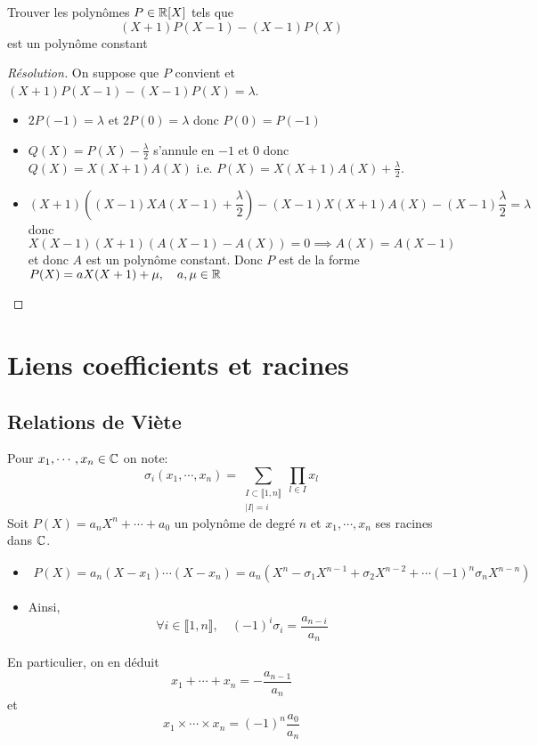 \begin{exo}
    Trouver les polynômes $P\in\mathbb R[X]$ tels que \[
        (X+1)P(X-1)-(X-1)P(X)
    \]
    est un polynôme constant
\end{exo}

\begin{proof}[Résolution]
    On suppose que $P$ convient et $(X+1)P(X-1)-(X-1)P(X)=\lambda$. \begin{itemize}
        \item $2P(-1)=\lambda$ et $2P(0)=\lambda$ donc $P(0)=P(-1)$
        \item $Q(X)=P(X)-\frac\lambda 2$ s'annule en $-1$ et $0$ donc $Q(X)=X(X+1)A(X)$ i.e.  $P(X)=X(X+1)A(X)+\frac\lambda 2$.
        \item \[
                (X+1)((X-1)X A(X-1)+\frac\lambda2)-(X-1)X(X+1)A(X)-(X-1)\frac\lambda2=\lambda
            \]
            donc \[
                X(X-1)(X+1)(A(X-1)-A(X))=0 \implies A(X)=A(X-1)
            \]
            et donc $A$ est un polynôme constant. Donc $P$ est de la forme $P(X)=aX(X+1)+\mu, \quad a, \mu\in\mathbb R$
    \end{itemize}
\end{proof}

\section{Liens coefficients et racines}

\subsection{Relations de Viète}


Pour $x_1, \cdots, x_n\in\mathbb C$ on note: \[
    \sigma_i(x_1, \cdots, x_n)=\sum_{\substack{I\subset \llbracket 1, n\rrbracket\\|I|=i}}\prod_{l\in I}x_l
\]
Soit $P(X)=a_nX^n+\cdots+a_0$ un polynôme de degré $n$ et $x_1, \cdots, x_n$ ses racines dans $\mathbb C$. \begin{itemize}
    \item \begin{align*}
            P(X)=a_n(X-x_1)\cdots (X-x_n)=a_n(X^n-\sigma_1 X^{n-1}+ \sigma_2 X^{n-2}+\cdots (-1)^n\sigma_nX^{n-n})
        \end{align*}
    \item Ainsi, \[
            \forall i\in\llbracket 1, n\rrbracket, \quad (-1)^i\sigma_i=\frac{a_{n-i}}{a_n}
        \]
\end{itemize}
En particulier, on en déduit \[
    x_1+\cdots+x_n = -\frac{a_{n-1}}{a_n}
\]
et \[
    x_1\times \cdots\times x_n=(-1)^n\frac{a_0}{a_n}
\]

